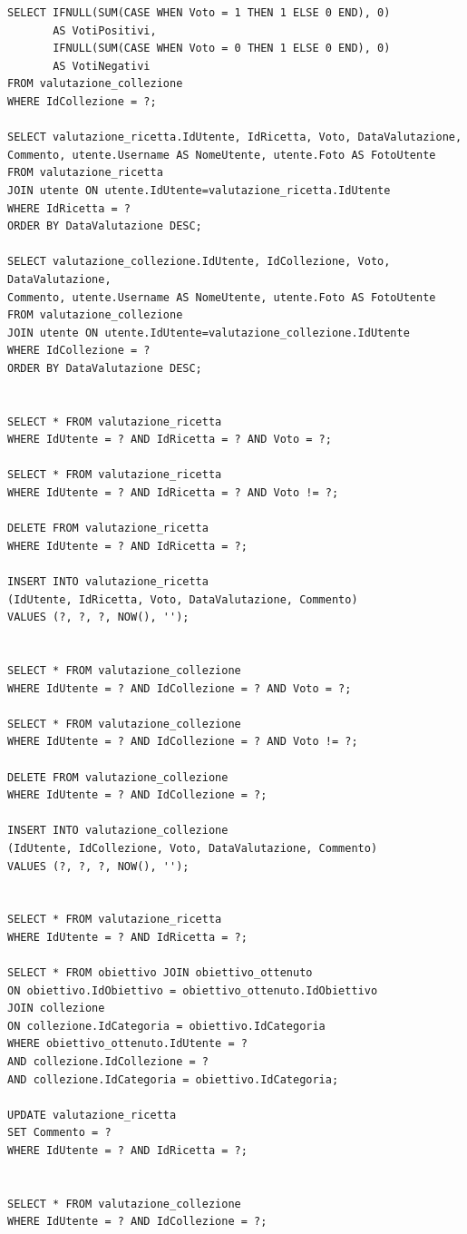 ﻿\documentclass[a4paper,12pt]{report}
\begin{document}
\begin{verbatim}
SELECT IFNULL(SUM(CASE WHEN Voto = 1 THEN 1 ELSE 0 END), 0)
       AS VotiPositivi,
       IFNULL(SUM(CASE WHEN Voto = 0 THEN 1 ELSE 0 END), 0)
       AS VotiNegativi
FROM valutazione_collezione
WHERE IdCollezione = ?;

SELECT valutazione_ricetta.IdUtente, IdRicetta, Voto, DataValutazione,
Commento, utente.Username AS NomeUtente, utente.Foto AS FotoUtente
FROM valutazione_ricetta
JOIN utente ON utente.IdUtente=valutazione_ricetta.IdUtente
WHERE IdRicetta = ?
ORDER BY DataValutazione DESC;

SELECT valutazione_collezione.IdUtente, IdCollezione, Voto, DataValutazione, 
Commento, utente.Username AS NomeUtente, utente.Foto AS FotoUtente
FROM valutazione_collezione
JOIN utente ON utente.IdUtente=valutazione_collezione.IdUtente
WHERE IdCollezione = ?
ORDER BY DataValutazione DESC;


SELECT * FROM valutazione_ricetta
WHERE IdUtente = ? AND IdRicetta = ? AND Voto = ?;

SELECT * FROM valutazione_ricetta
WHERE IdUtente = ? AND IdRicetta = ? AND Voto != ?;

DELETE FROM valutazione_ricetta
WHERE IdUtente = ? AND IdRicetta = ?;

INSERT INTO valutazione_ricetta
(IdUtente, IdRicetta, Voto, DataValutazione, Commento)
VALUES (?, ?, ?, NOW(), '');


SELECT * FROM valutazione_collezione
WHERE IdUtente = ? AND IdCollezione = ? AND Voto = ?;

SELECT * FROM valutazione_collezione
WHERE IdUtente = ? AND IdCollezione = ? AND Voto != ?;

DELETE FROM valutazione_collezione
WHERE IdUtente = ? AND IdCollezione = ?;

INSERT INTO valutazione_collezione
(IdUtente, IdCollezione, Voto, DataValutazione, Commento)
VALUES (?, ?, ?, NOW(), '');


SELECT * FROM valutazione_ricetta
WHERE IdUtente = ? AND IdRicetta = ?;

SELECT * FROM obiettivo JOIN obiettivo_ottenuto
ON obiettivo.IdObiettivo = obiettivo_ottenuto.IdObiettivo
JOIN collezione
ON collezione.IdCategoria = obiettivo.IdCategoria
WHERE obiettivo_ottenuto.IdUtente = ?
AND collezione.IdCollezione = ?
AND collezione.IdCategoria = obiettivo.IdCategoria;

UPDATE valutazione_ricetta
SET Commento = ?
WHERE IdUtente = ? AND IdRicetta = ?;


SELECT * FROM valutazione_collezione
WHERE IdUtente = ? AND IdCollezione = ?;


\end{verbatim}
\end{document}
